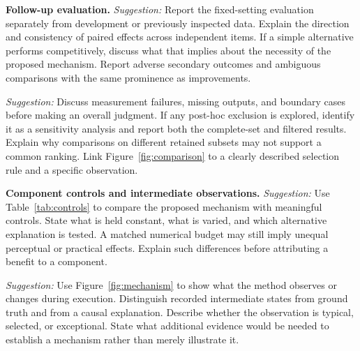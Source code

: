 \documentclass[]{spie}
\newcommand{\suggest}{\textit{Suggestion:} }
\begin{document}

\textbf{Follow-up evaluation.} \suggest Report the fixed-setting evaluation separately from development or previously inspected data. Explain the direction and consistency of paired effects across independent items. If a simple alternative performs competitively, discuss what that implies about the necessity of the proposed mechanism. Report adverse secondary outcomes and ambiguous comparisons with the same prominence as improvements.

\suggest Discuss measurement failures, missing outputs, and boundary cases before making an overall judgment. If any post-hoc exclusion is explored, identify it as a sensitivity analysis and report both the complete-set and filtered results. Explain why comparisons on different retained subsets may not support a common ranking. Link Figure~\ref{fig:comparison} to a clearly described selection rule and a specific observation.


\textbf{Component controls and intermediate observations.} \suggest Use Table~\ref{tab:controls} to compare the proposed mechanism with meaningful controls. State what is held constant, what is varied, and which alternative explanation is tested. A matched numerical budget may still imply unequal perceptual or practical effects. Explain such differences before attributing a benefit to a component.

\suggest Use Figure~\ref{fig:mechanism} to show what the method observes or changes during execution. Distinguish recorded intermediate states from ground truth and from a causal explanation. Describe whether the observation is typical, selected, or exceptional. State what additional evidence would be needed to establish a mechanism rather than merely illustrate it.
\end{document}
